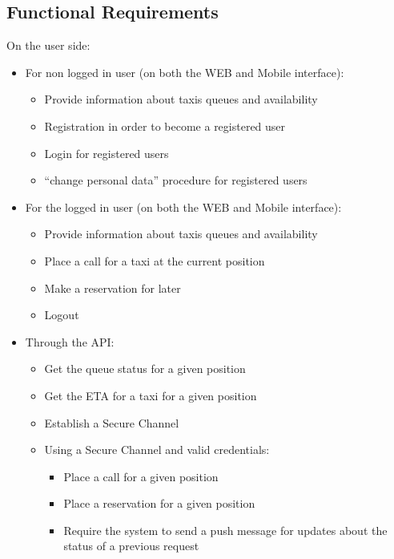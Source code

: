 \documentclass{article}
\begin{document}
\subsection{Functional Requirements}
On the user side:\@
\begin{itemize}
	\item For non logged in user (on both the WEB and Mobile interface):
		\begin{itemize}
			\item Provide information about taxis queues and availability %
			\item Registration in order to become a registered user %
			\item Login for registered users
			\item ``change personal data'' procedure for registered users
		\end{itemize}
	\item For the logged in user (on both the WEB and Mobile interface):
		\begin{itemize}
			\item Provide information about taxis queues and availability 
			\item Place a call for a taxi at the current position 
			\item Make a reservation for later
			\item Logout
		\end{itemize}
	\item Through the API:\@
		\begin{itemize}
			\item Get the queue status for a given position
			\item Get the ETA for a taxi for a given position
			\item Establish a Secure Channel 
			\item Using a Secure Channel and valid credentials:\@
				\begin{itemize}
					\item Place a call for a given position
					\item Place a reservation for a given position
					\item Require the system to send a push message for updates about the status of a previous request
				\end{itemize}
		\end{itemize}
\end{itemize}
\end{document}
